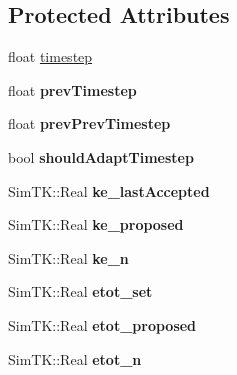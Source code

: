 \subsection*{Protected Attributes}
\begin{DoxyCompactItemize}
\item 
float \hyperlink{classHMCSampler_a8cd8b25b42e94acb34aa0dea64c67b5b}{timestep}
\item 
float {\bfseries prev\+Timestep}\hypertarget{classHMCSampler_a8ae12739d6e0fce6e22d26e0e90d67a8}{}\label{classHMCSampler_a8ae12739d6e0fce6e22d26e0e90d67a8}

\item 
float {\bfseries prev\+Prev\+Timestep}\hypertarget{classHMCSampler_a061efabb2c1486e64b6b2cbc9cab0245}{}\label{classHMCSampler_a061efabb2c1486e64b6b2cbc9cab0245}

\item 
bool {\bfseries should\+Adapt\+Timestep}\hypertarget{classHMCSampler_ae573472509f1c59add03d72f753c4f06}{}\label{classHMCSampler_ae573472509f1c59add03d72f753c4f06}

\item 
Sim\+T\+K\+::\+Real {\bfseries ke\+\_\+last\+Accepted}\hypertarget{classHMCSampler_a73f309b15007ce520f6117080975da6d}{}\label{classHMCSampler_a73f309b15007ce520f6117080975da6d}

\item 
Sim\+T\+K\+::\+Real {\bfseries ke\+\_\+proposed}\hypertarget{classHMCSampler_a969e707966ce88fd12b21a86bc60f7bf}{}\label{classHMCSampler_a969e707966ce88fd12b21a86bc60f7bf}

\item 
Sim\+T\+K\+::\+Real {\bfseries ke\+\_\+n}\hypertarget{classHMCSampler_aa13c23e6ba3ebe6222228285fd94c4a4}{}\label{classHMCSampler_aa13c23e6ba3ebe6222228285fd94c4a4}

\item 
Sim\+T\+K\+::\+Real {\bfseries etot\+\_\+set}\hypertarget{classHMCSampler_a3dfcb5672d86f951f647068099165923}{}\label{classHMCSampler_a3dfcb5672d86f951f647068099165923}

\item 
Sim\+T\+K\+::\+Real {\bfseries etot\+\_\+proposed}\hypertarget{classHMCSampler_af3693cc4c5cf76ce9dce559b702c699c}{}\label{classHMCSampler_af3693cc4c5cf76ce9dce559b702c699c}

\item 
Sim\+T\+K\+::\+Real {\bfseries etot\+\_\+n}\hypertarget{classHMCSampler_ab39e667c819a1e0354d765ba5418a717}{}\label{classHMCSampler_ab39e667c819a1e0354d765ba5418a717}


\end{DoxyCompactItemize}
